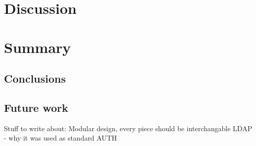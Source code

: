 \documentclass[a4paper,12pt]{article}
\begin{document}
\section{Discussion}

\section{Summary}
\subsection{Conclusions}

\subsection{Future work}

Stuff to write about:
Modular design, every piece should be interchangable
LDAP - why it was used as standard AUTH


\newpage


\end{document}
